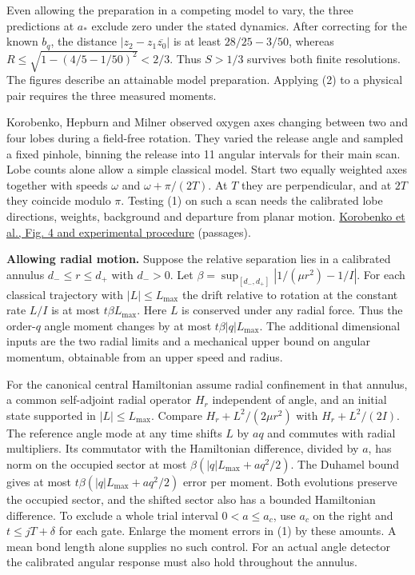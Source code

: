 \documentclass[11pt,a4paper]{article}
\begin{document}
Even allowing the preparation in a competing model to vary, the three
predictions at \(a_*\) exclude zero under the stated dynamics. After
correcting for the known \(b_q\), the distance
\(|z_2-z_1\overline{z_0}|\) is at least \(28/25-3/50\), whereas
\(R\le\sqrt{1-(4/5-1/50)^2}<2/3\). Thus \(S>1/3\) survives both finite
resolutions. The figures describe an attainable model preparation.
Applying (2) to a physical pair requires the three measured moments.

Korobenko, Hepburn and Milner observed oxygen axes changing between two
and four lobes during a field-free rotation. They varied the release
angle and sampled a fixed pinhole, binning the release into 11 angular
intervals for their main scan. Lobe counts alone allow a simple
classical model. Start two equally weighted axes together with speeds
\(\omega\) and \(\omega+\pi/(2T)\). At \(T\) they are perpendicular, and
at \(2T\) they coincide modulo \(\pi\). Testing (1) on such a scan needs
the calibrated lobe directions, weights, background and departure from
planar motion.
\href{https://pubs.rsc.org/en/content/getauthorversionpdf/C4CP04434G\#page=4}{Korobenko
et al., Fig. 4 and experimental procedure} (passages).

\textbf{Allowing radial motion.} Suppose the relative separation lies in
a calibrated annulus \(d_-\le r\le d_+\) with \(d_->0\). Let
\(\beta=\sup_{[d_-,d_+]}|1/(\mu r^2)-1/I|\). For each classical
trajectory with \(|L|\le L_{\max}\) the drift relative to rotation at
the constant rate \(L/I\) is at most \(t\beta L_{\max}\). Here \(L\) is
conserved under any radial force. Thus the order-\(q\) angle moment
changes by at most \(t\beta |q|L_{\max}\). The additional dimensional
inputs are the two radial limits and a mechanical upper bound on angular
momentum, obtainable from an upper speed and radius.

For the canonical central Hamiltonian assume radial confinement in that
annulus, a common self-adjoint radial operator \(H_r\) independent of
angle, and an initial state supported in \(|L|\le L_{\max}\). Compare
\(H_r+L^2/(2\mu r^2)\) with \(H_r+L^2/(2I)\). The reference angle mode
at any time shifts \(L\) by \(aq\) and commutes with radial multipliers.
Its commutator with the Hamiltonian difference, divided by \(a\), has
norm on the occupied sector at most \(\beta(|q|L_{\max}+a q^2/2)\). The
Duhamel bound gives at most \(t\beta(|q|L_{\max}+a q^2/2)\) error per
moment. Both evolutions preserve the occupied sector, and the shifted
sector also has a bounded Hamiltonian difference. To exclude a whole
trial interval \(0<a\le a_c\), use \(a_c\) on the right and
\(t\le jT+\delta\) for each gate. Enlarge the moment errors in (1) by
these amounts. A mean bond length alone supplies no such control. For an
actual angle detector the calibrated angular response must also hold
throughout the annulus.
\end{document}
